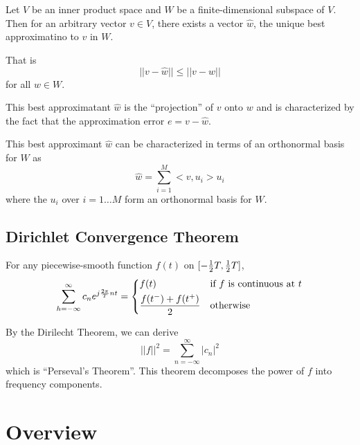 \documentclass[12pt]{article}
\begin{document}
\begin{theorem}
Let $V$ be an inner product space and $W$ be a finite-dimensional subspace of $V$. Then for an arbitrary vector $v\in V$, there exists a vector $\hat w$, the unique best approximatino to $v$ in $W$.

That is \[ || v - \hat w|| \leq ||v - w|| \] for all $w\in W$.

This best approximatant $\hat w$ is the ``projection'' of $v$ onto $w$ and is characterized by the fact that the approximation error $e = v - \hat w$.
\end{theorem}

This best approximant $\hat w$ can be characterized in terms of an orthonormal basis for $W$ as \[ \hat w = \sum_{i=1}^M <v, u_i> u_i \] where the $u_i$ over $i = 1\dots M$ form an orthonormal basis for $W$.

\subsection{Dirichlet Convergence Theorem}
For any piecewise-smooth function $f(t)$ on $[-\frac{1}{2} T, \frac{1}{2} T]$, \[ \sum_{h=-\infty}^\infty c_n e^{j\frac{2\pi}{T} nt} =
\begin{dcases*}
f(t) & if $f$ is continuous at $t$\\
\frac{f(t^-) + f(t^+)}{2} & otherwise
\end{dcases*}\]

By the Dirilecht Theorem, we can derive \[ {||f||}^2 = \sum_{n=-\infty}^\infty |c_n|^2 \] which is ``Perseval's Theorem''. This theorem decomposes the power of $f$ into frequency components.

\section{Overview}
\end{document}
